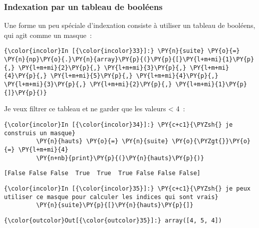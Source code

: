     \hypertarget{indexation-par-un-tableau-de-booluxe9ens}{%
\subsubsection{Indexation par un tableau de
booléens}\label{indexation-par-un-tableau-de-booluxe9ens}}

    Une forme un peu spéciale d'indexation consiste à utiliser un tableau de
booléens, qui agit comme un masque~:

    \begin{Verbatim}[commandchars=\\\{\}]
{\color{incolor}In [{\color{incolor}33}]:} \PY{n}{suite} \PY{o}{=} \PY{n}{np}\PY{o}{.}\PY{n}{array}\PY{p}{(}\PY{p}{[}\PY{l+m+mi}{1}\PY{p}{,} \PY{l+m+mi}{2}\PY{p}{,} \PY{l+m+mi}{3}\PY{p}{,} \PY{l+m+mi}{4}\PY{p}{,} \PY{l+m+mi}{5}\PY{p}{,} \PY{l+m+mi}{4}\PY{p}{,} \PY{l+m+mi}{3}\PY{p}{,} \PY{l+m+mi}{2}\PY{p}{,} \PY{l+m+mi}{1}\PY{p}{]}\PY{p}{)}
\end{Verbatim}


    Je veux filtrer ce tableau et ne garder que les valeurs \textless{} 4~:

    \begin{Verbatim}[commandchars=\\\{\}]
{\color{incolor}In [{\color{incolor}34}]:} \PY{c+c1}{\PYZsh{} je construis un masque}
         \PY{n}{hauts} \PY{o}{=} \PY{n}{suite} \PY{o}{\PYZgt{}}\PY{o}{=} \PY{l+m+mi}{4}
         \PY{n+nb}{print}\PY{p}{(}\PY{n}{hauts}\PY{p}{)}
\end{Verbatim}


    \begin{Verbatim}[commandchars=\\\{\}]
[False False False  True  True  True False False False]

    \end{Verbatim}

    \begin{Verbatim}[commandchars=\\\{\}]
{\color{incolor}In [{\color{incolor}35}]:} \PY{c+c1}{\PYZsh{} je peux utiliser ce masque pour calculer les indices qui sont vrais}
         \PY{n}{suite}\PY{p}{[}\PY{n}{hauts}\PY{p}{]}
\end{Verbatim}


\begin{Verbatim}[commandchars=\\\{\}]
{\color{outcolor}Out[{\color{outcolor}35}]:} array([4, 5, 4])
\end{Verbatim}
            
